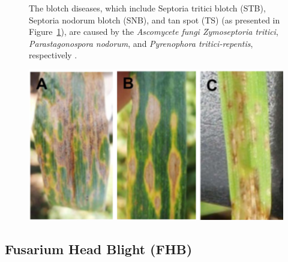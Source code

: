 \begin{figure}[H]
    \centering
    \begin{minipage}{0.55\textwidth}
        
        The blotch diseases, which include Septoria tritici blotch (STB), Septoria nodorum blotch (SNB), and tan spot (TS) (as presented in Figure~\ref{fig:Figure06}), are caused by the  \textit{Ascomycete fungi Zymoseptoria tritici}, \textit{Parastagonospora nodorum}, and \textit{Pyrenophora tritici-repentis}, respectively \parencite{figueroa2018review}.
    \end{minipage}%
    \hfill
    \begin{minipage}{0.4\textwidth}
        \centering
        \includegraphics[width=0.9\linewidth]{chapters/chapter2/images/Figure06.png}
        \label{fig:Figure06}
    \end{minipage}
\end{figure}

\subsection{Fusarium Head Blight (FHB)}

